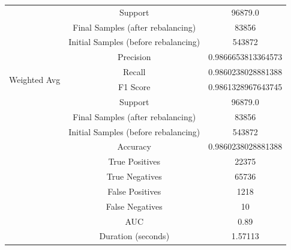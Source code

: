 \begin{longtable}{|c|c|c|}
 & Support & 96879.0 \\
 & Final Samples (after rebalancing) & 83856 \\
 & Initial Samples (before rebalancing) & 543872 \\
\hline
\multirow{4}{*}{Weighted Avg} & Precision & 0.9866653813364573 \\
 & Recall & 0.9860238028881388 \\
 & F1 Score & 0.9861328967643745 \\
 & Support & 96879.0 \\
 & Final Samples (after rebalancing) & 83856 \\
 & Initial Samples (before rebalancing) & 543872 \\
\hline
& Accuracy & 0.9860238028881388 \\ \hline
& True Positives & 22375 \\ \hline
& True Negatives & 65736 \\ \hline
& False Positives & 1218 \\ \hline
& False Negatives & 10 \\ \hline
& AUC & 0.89 \\ \hline
& Duration (seconds) & 1.57113 \\ \hline
\end{longtable}


